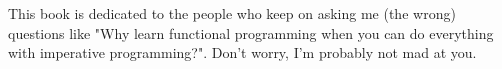 This book is dedicated to the people who keep on asking me (the wrong) questions like "Why learn functional programming when you can do everything with imperative programming?". Don't worry, I'm probably not mad at you.